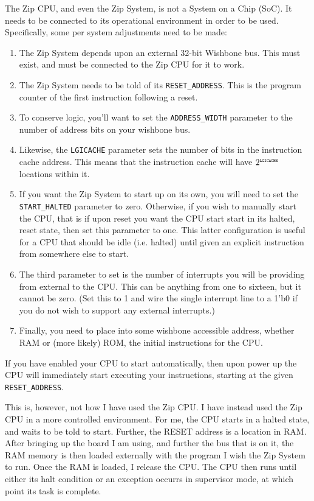\documentclass{gqtekspec}
\begin{document}
The Zip CPU, and even the Zip System, is not a System on a Chip (SoC).  It 
needs to be connected to its operational environment in order to be used.
Specifically, some per system adjustments need to be made:
\begin{enumerate}
\item The Zip System depends upon an external 32-bit Wishbone bus.  This
	must exist, and must be connected to the Zip CPU for it to work.
\item The Zip System needs to be told of its {\tt RESET\_ADDRESS}.  This is
	the program counter of the first instruction following a reset.
\item To conserve logic, you'll want to set the {\tt ADDRESS\_WIDTH} parameter
	to the number of address bits on your wishbone bus.
\item Likewise, the {\tt LGICACHE} parameter sets the number of bits in
	the instruction cache address.  This means that the instruction cache
	will have $2^{\mbox{\tiny\tt LGICACHE}}$ locations within it.
\item If you want the Zip System to start up on its own, you will need to
	set the {\tt START\_HALTED} parameter to zero.  Otherwise, if you
	wish to manually start the CPU, that is if upon reset you want the
	CPU start start in its halted, reset state, then set this parameter to
	one.  This latter configuration is useful for a CPU that should be
	idle (i.e. halted) until given an explicit instruction from somewhere
	else to start.
\item The third parameter to set is the number of interrupts you will be
	providing from external to the CPU.  This can be anything from one
	to sixteen, but it cannot be zero.  (Set this to 1 and wire the single
	interrupt line to a 1'b0 if you do not wish to support any external
	interrupts.)
\item Finally, you need to place into some wishbone accessible address, whether
	RAM or (more likely) ROM, the initial instructions for the CPU.
\end{enumerate}
If you have enabled your CPU to start automatically, then upon power up the
CPU will immediately start executing your instructions, starting at the given
{\tt RESET\_ADDRESS}.

This is, however, not how I have used the Zip CPU.  I have instead used the
Zip CPU in a more controlled environment.  For me, the CPU starts in a 
halted state, and waits to be told to start.  Further, the RESET address is a
location in RAM.  After bringing up the board I am using, and further the
bus that is on it, the RAM memory is then loaded externally with the program
I wish the Zip System to run.  Once the RAM is loaded, I release the CPU.
The CPU then runs until either its halt condition or an exception occurrs in
supervisor mode, at which point its task is complete.
\end{document}
